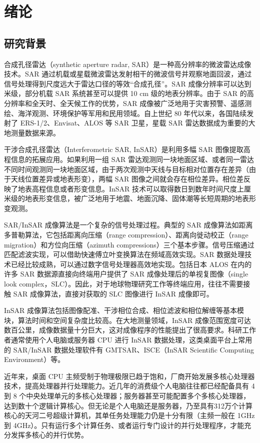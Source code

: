 \chapter{绪论}


\section{研究背景}

合成孔径雷达（synthetic aperture radar, SAR）是一种高分辨率的微波雷达成像技术。SAR 通过机载或星载微波雷达发射相干的微波信号并观察地面回波，通过信号处理得到尺度远大于雷达口径的等效“合成孔径”。SAR 成像分辨率可以达到米级，部分机载 SAR 系统甚至可以提供 10 cm 级的地表分辨率。由于 SAR 的高分辨率和全天时、全天候工作的优势，SAR 成像被广泛地用于灾害预警、遥感测绘、海洋观测、环境保护等军用和民用领域。自上世纪 80 年代以来，各国陆续发射了 ERS-1/2、Envisat、ALOS 等 SAR 卫星，星载 SAR 雷达数据成为重要的大地测量数据来源。

干涉合成孔径雷达（Interferometric SAR, InSAR）是利用多幅 SAR 图像提取高程信息的拓展应用。如果利用一组 SAR 雷达观测同一块地面区域、或者同一雷达不同时间观测同一块地面区域，由于两次观测中天线与目标相对位置存在差异（由于天线位置差异或地表形变），两幅 SAR 图像之间就会存在相位差异。相位差反映了地表高程信息或者形变信息。InSAR 技术可以取得数日到数年时间尺度上厘米级的地表形变信息，被广泛地用于地震、地面沉降、固体潮等长短周期的地表形变观测。

SAR/InSAR 成像算法是一个复杂的信号处理过程。典型的 SAR 成像算法如距离多普勒算法，它包括距离向压缩（range compression）、距离向徙动校正（range migration）和方位向压缩（azimuth compressions）三个基本步骤。信号压缩通过匹配滤波实现，可以借助快速傅立叶变换算法在频域高效实现。SAR 数据处理技术已经比较成熟，可以通过数字信号处理器高效地实现。包括日本 ALOS 在内的许多 SAR 数据源直接向终端用户提供了 SAR 成像处理后的单视复图像（single look complex，SLC）。因此，对于地球物理研究工作等终端应用，往往不需要接触 SAR 成像算法，直接对获取的 SLC 图像进行 InSAR 成像即可。

InSAR 成像算法包括图像配准、干涉相位合成、相位滤波和相位解缠等基本模块，算法时间和空间复杂度比较高。在大地测量领域，InSAR 成像范围宽度可达数百公里，成像数据量十分巨大，这对成像程序的性能提出了很高要求。科研工作者通常使用个人电脑或服务器 CPU 进行 InSAR 数据处理，这类桌面平台上常用的 SAR/InSAR 数据处理软件有 GMTSAR、ISCE（InSAR Scientific Computing Environment）等。

近年来，桌面 CPU 主频受制于物理极限已趋于饱和，厂商开始发展多核心处理器技术，提高处理器并行处理能力。近几年的消费级个人电脑往往都已经配备具有 4 到 8 个中央处理单元的多核心处理器；服务器甚至可能配置多个多核心处理器，达到数十个逻辑计算核心。但无论是个人电脑还是服务器，乃至具有312万个计算核心的天河二号超级计算机，其单任务处理能力仍是十分有限（主频一般在 1GHz 到 4GHz）。只有运行多个计算任务、或者运行专门设计的并行处理程序，才能充分发挥多核心的并行优势。

